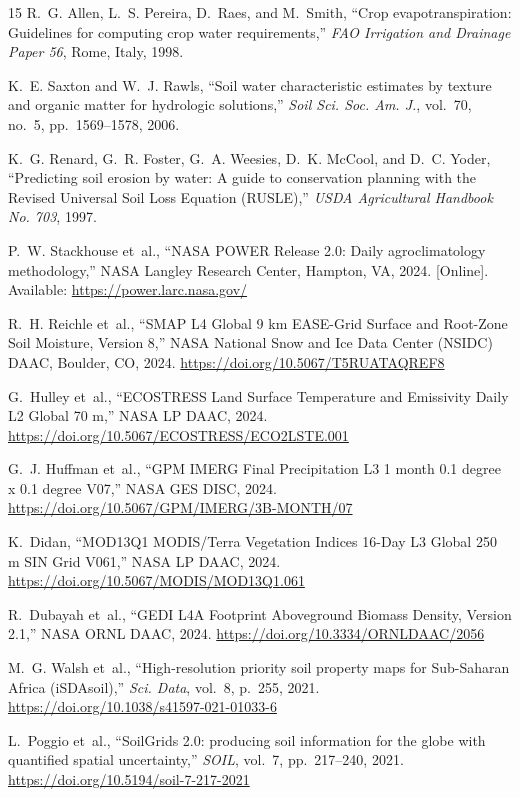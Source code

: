 \documentclass[10pt,twocolumn]{article}
\begin{document}
\begin{thebibliography}{15}
\small
{}
R.~G. Allen, L.~S. Pereira, D.~Raes, and M.~Smith, ``Crop evapotranspiration: Guidelines for computing crop water requirements,'' \textit{FAO Irrigation and Drainage Paper 56}, Rome, Italy, 1998.

K.~E. Saxton and W.~J. Rawls, ``Soil water characteristic estimates by texture and organic matter for hydrologic solutions,'' \textit{Soil Sci. Soc. Am. J.}, vol.~70, no.~5, pp.~1569--1578, 2006.

K.~G. Renard, G.~R. Foster, G.~A. Weesies, D.~K. McCool, and D.~C. Yoder, ``Predicting soil erosion by water: A guide to conservation planning with the Revised Universal Soil Loss Equation (RUSLE),'' \textit{USDA Agricultural Handbook No. 703}, 1997.

P.~W. Stackhouse et~al., ``NASA POWER Release 2.0: Daily agroclimatology methodology,'' NASA Langley Research Center, Hampton, VA, 2024. [Online]. Available: \url{https://power.larc.nasa.gov/}

R.~H. Reichle et~al., ``SMAP L4 Global 9 km EASE-Grid Surface and Root-Zone Soil Moisture, Version 8,'' NASA National Snow and Ice Data Center (NSIDC) DAAC, Boulder, CO, 2024. \url{https://doi.org/10.5067/T5RUATAQREF8}

G.~Hulley et~al., ``ECOSTRESS Land Surface Temperature and Emissivity Daily L2 Global 70 m,'' NASA LP DAAC, 2024. \url{https://doi.org/10.5067/ECOSTRESS/ECO2LSTE.001}

G.~J. Huffman et~al., ``GPM IMERG Final Precipitation L3 1 month 0.1 degree x 0.1 degree V07,'' NASA GES DISC, 2024. \url{https://doi.org/10.5067/GPM/IMERG/3B-MONTH/07}

K.~Didan, ``MOD13Q1 MODIS/Terra Vegetation Indices 16-Day L3 Global 250 m SIN Grid V061,'' NASA LP DAAC, 2024. \url{https://doi.org/10.5067/MODIS/MOD13Q1.061}

R.~Dubayah et~al., ``GEDI L4A Footprint Aboveground Biomass Density, Version 2.1,'' NASA ORNL DAAC, 2024. \url{https://doi.org/10.3334/ORNLDAAC/2056}

M.~G. Walsh et~al., ``High-resolution priority soil property maps for Sub-Saharan Africa (iSDAsoil),'' \textit{Sci. Data}, vol.~8, p.~255, 2021. \url{https://doi.org/10.1038/s41597-021-01033-6}

L.~Poggio et~al., ``SoilGrids 2.0: producing soil information for the globe with quantified spatial uncertainty,'' \textit{SOIL}, vol.~7, pp.~217--240, 2021. \url{https://doi.org/10.5194/soil-7-217-2021}


\end{thebibliography}
\end{document}
